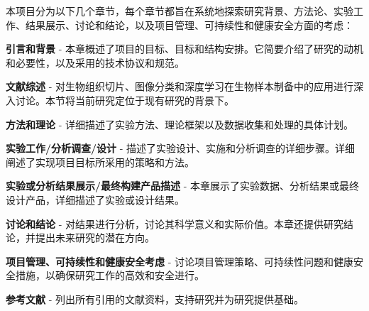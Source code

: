 



本项目分为以下几个章节，每个章节都旨在系统地探索研究背景、方法论、实验工作、结果展示、讨论和结论，以及项目管理、可持续性和健康安全方面的考虑：

\textbf{引言和背景} - 本章概述了项目的目标、目标和结构安排。它简要介绍了研究的动机和必要性，以及采用的技术协议和规范。

\textbf{文献综述} - 对生物组织切片、图像分类和深度学习在生物样本制备中的应用进行深入讨论。本节将当前研究定位于现有研究的背景下。

\textbf{方法和理论} - 详细描述了实验方法、理论框架以及数据收集和处理的具体计划。

\textbf{实验工作/分析调查/设计} - 描述了实验设计、实施和分析调查的详细步骤。详细阐述了实现项目目标所采用的策略和方法。

\textbf{实验或分析结果展示/最终构建产品描述} - 本章展示了实验数据、分析结果或最终设计产品，详细描述了实验或设计结果。

\textbf{讨论和结论} - 对结果进行分析，讨论其科学意义和实际价值。本章还提供研究结论，并提出未来研究的潜在方向。

\textbf{项目管理、可持续性和健康安全考虑} - 讨论项目管理策略、可持续性问题和健康安全措施，以确保研究工作的高效和安全进行。

\textbf{参考文献} - 列出所有引用的文献资料，支持研究并为研究提供基础。

